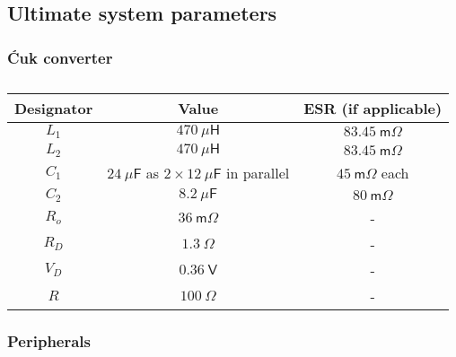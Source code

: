 \subsection{Ultimate system parameters} \label{sec:system_params}
\subsubsection{\'{C}uk converter}
\begin{table}[H]
\centering
\begin{tabular}{|c|c|c|}
\hline
Designator & Value & ESR (if applicable)\\
\hline
$L_1$ & $470 \ \mathsf{\mu H}$ & $83.45 \ \mathsf{m \Omega}$\\
\hline
$L_2$ & $470 \ \mathsf{\mu H}$ & $83.45 \ \mathsf{m \Omega}$\\
\hline
$C_1$ & $24 \ \mathsf{\mu F}$ as $2 \times 12 \ \mathsf{\mu F}$ in parallel & $45 \ \mathsf{m \Omega}$ each\\
\hline
$C_2$ & $8.2 \ \mathsf{\mu F}$ & $80 \ \mathsf{m \Omega}$\\
\hline
$R_o$ & $36 \ \mathsf{m \Omega}$ & -\\
\hline
$R_D$ & $1.3 \ \mathsf{\Omega}$ & -\\
\hline
$V_D$ & $0.36 \ \mathsf{V}$ & -\\
\hline
$R$ & $100 \ \mathsf{\Omega}$ & -\\
\hline
\end{tabular}
\caption{}
\label{tab:cuk_values}
\end{table}
\subsubsection{Peripherals}
